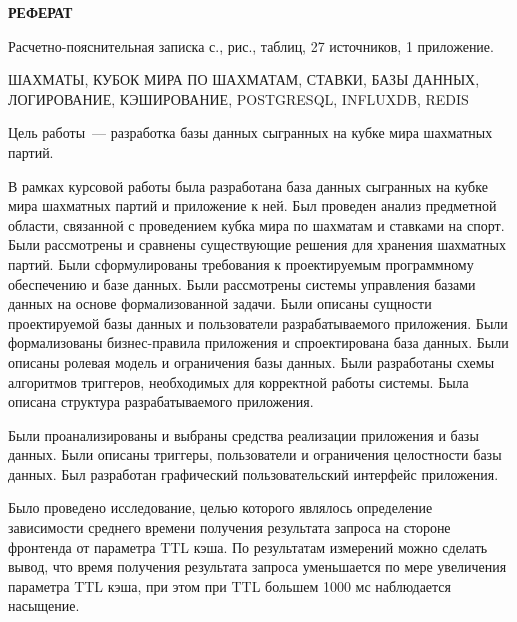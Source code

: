 \begin{center}
	\LARGE\bfseries{РЕФЕРАТ}
\end{center}

Расчетно-пояснительная записка \pageref{LastPage} с., \totalfigures{} рис., \totaltables{} таблиц, 27 источников, 1 приложение.

ШАХМАТЫ, КУБОК МИРА ПО ШАХМАТАМ, СТАВКИ, БАЗЫ ДАННЫХ, ЛОГИРОВАНИЕ, КЭШИРОВАНИЕ, POSTGRESQL, INFLUXDB, REDIS

Цель работы~--- разработка базы данных сыгранных на кубке мира шахматных партий.

В рамках курсовой работы была разработана база данных сыгранных на кубке мира шахматных партий и приложение к ней. Был проведен анализ предметной области, связанной с проведением кубка мира по шахматам и ставками на спорт. Были рассмотрены и сравнены существующие решения для хранения шахматных партий. Были сформулированы требования к проектируемым программному обеспечению и базе данных. Были рассмотрены системы управления базами данных на основе формализованной задачи. Были описаны сущности проектируемой базы данных и пользователи разрабатываемого приложения.
Были формализованы бизнес-правила приложения и спроектирована база данных. Были описаны ролевая модель и ограничения базы данных. Были разработаны схемы алгоритмов триггеров, необходимых для корректной работы системы. Была описана структура разрабатываемого приложения.

Были проанализированы и выбраны средства реализации приложения и базы данных. Были описаны триггеры, пользователи и ограничения целостности базы данных. Был разработан графический пользовательский интерфейс приложения.

Было проведено исследование, целью которого являлось определение зависимости среднего времени получения результата запроса на стороне фронтенда от параметра TTL кэша. По результатам измерений можно сделать вывод, что время получения результата запроса уменьшается по мере увеличения параметра TTL кэша, при этом при TTL большем 1000 мс наблюдается насыщение.
